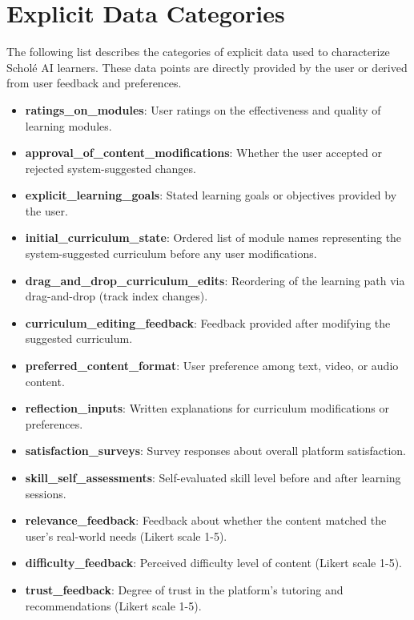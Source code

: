 \documentclass[sigconf]{acmart}
\begin{document}





\appendix


\section{Explicit Data Categories}
\label{appendix:explicit_data}

The following list describes the categories of explicit data used to characterize Schol\'e AI learners. These data points are directly provided by the user or derived from user feedback and preferences.
{\footnotesize
\begin{itemize}
    \item \textbf{ratings\_on\_modules}: User ratings on the effectiveness and quality of learning modules.
    \item \textbf{approval\_of\_content\_modifications}: Whether the user accepted or rejected system-suggested changes.
    \item \textbf{explicit\_learning\_goals}: Stated learning goals or objectives provided by the user.
    \item \textbf{initial\_curriculum\_state}: Ordered list of module names representing the system-suggested curriculum before any user modifications.
    \item \textbf{drag\_and\_drop\_curriculum\_edits}: Reordering of the learning path via drag-and-drop (track index changes).
    \item \textbf{curriculum\_editing\_feedback}: Feedback provided after modifying the suggested curriculum.
    \item \textbf{preferred\_content\_format}: User preference among text, video, or audio content.
    \item \textbf{reflection\_inputs}: Written explanations for curriculum modifications or preferences.
    \item \textbf{satisfaction\_surveys}: Survey responses about overall platform satisfaction.
    \item \textbf{skill\_self\_assessments}: Self-evaluated skill level before and after learning sessions.
    \item \textbf{relevance\_feedback}: Feedback about whether the content matched the user's real-world needs (Likert scale 1-5).
    \item \textbf{difficulty\_feedback}: Perceived difficulty level of content (Likert scale 1-5).
    \item \textbf{trust\_feedback}: Degree of trust in the platform's tutoring and recommendations (Likert scale 1-5).
\end{itemize}
}
\end{document}
